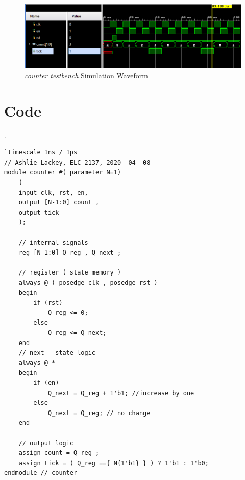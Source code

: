 \documentclass[11pt]{article}
\begin{document}
\begin{figure}[ht]\centering
	\includegraphics[width=1\textwidth]{counter_test}
	\caption{\textit{counter testbench} Simulation Waveform}
	\label{fig:sim_with_table}
\end{figure}

\clearpage

\section*{Code}
.

\begin{lstlisting}[style=Verilog,caption=Counter Verilog Code,label=code:ex ]
`timescale 1ns / 1ps
// Ashlie Lackey, ELC 2137, 2020 -04 -08
module counter #( parameter N=1)
	(
	input clk, rst, en,
	output [N-1:0] count ,
	output tick
	);
	
	// internal signals
	reg [N-1:0] Q_reg , Q_next ;
	
	// register ( state memory )
	always @ ( posedge clk , posedge rst )
	begin
		if (rst)
			Q_reg <= 0;
		else
			Q_reg <= Q_next;
	end
	// next - state logic
	always @ *
	begin
		if (en)
			Q_next = Q_reg + 1'b1; //increase by one
		else
			Q_next = Q_reg; // no change
	end
	
	// output logic
	assign count = Q_reg ;
	assign tick = ( Q_reg =={ N{1'b1} } ) ? 1'b1 : 1'b0;
endmodule // counter
\end{lstlisting}
\end{document}
